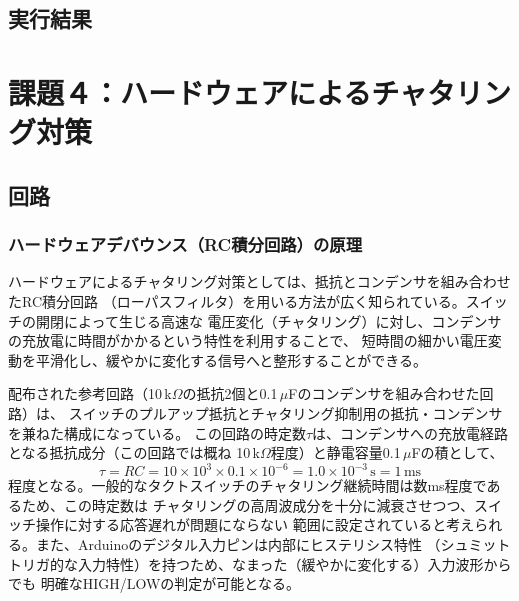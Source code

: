 \documentclass[12pt,a4paper]{ltjsarticle}
\begin{document}
\subsection{実行結果}\label{sec:task3-result}

%

\section{課題４：ハードウェアによるチャタリング対策}\label{sec:task4}


\subsection{回路}\label{sec:task4-circuit}

\subsubsection{ハードウェアデバウンス（RC積分回路）の原理}
ハードウェアによるチャタリング対策としては、抵抗とコンデンサを組み合わせたRC積分回路
（ローパスフィルタ）を用いる方法が広く知られている。スイッチの開閉によって生じる高速な
電圧変化（チャタリング）に対し、コンデンサの充放電に時間がかかるという特性を利用することで、
短時間の細かい電圧変動を平滑化し、緩やかに変化する信号へと整形することができる。

配布された参考回路（10\,k$\Omega$の抵抗2個と0.1\,$\mu$Fのコンデンサを組み合わせた回路）は、
スイッチのプルアップ抵抗とチャタリング抑制用の抵抗・コンデンサを兼ねた構成になっている。
この回路の時定数$\tau$は、コンデンサへの充放電経路となる抵抗成分（この回路では概ね
10\,k$\Omega$程度）と静電容量0.1\,$\mu$Fの積として、
$$ \tau = RC = 10\times10^{3} \times 0.1\times10^{-6} = 1.0\times10^{-3}\,\mathrm{s} = 1\,\mathrm{ms} $$
程度となる。一般的なタクトスイッチのチャタリング継続時間は数ms程度であるため、この時定数は
チャタリングの高周波成分を十分に減衰させつつ、スイッチ操作に対する応答遅れが問題にならない
範囲に設定されていると考えられる。また、Arduinoのデジタル入力ピンは内部にヒステリシス特性
（シュミットトリガ的な入力特性）を持つため、なまった（緩やかに変化する）入力波形からでも
明確なHIGH/LOWの判定が可能となる。
\end{document}
